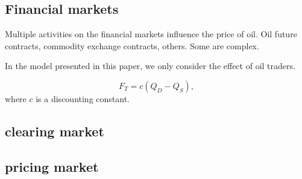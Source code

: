 \subsection{Financial markets}
Multiple activities on the financial markets influence the price of oil.
Oil future contracts, commodity exchange contracts, others.
Some are complex. 

In the model presented in this paper, we only consider the effect of oil traders.

\begin{equation}
    F_T = c (Q_D - Q_S),
\end{equation}
where $c$ is a discounting constant.


\subsection{clearing market}


\subsection{pricing market}
